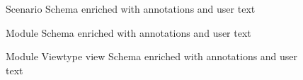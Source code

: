 \begin{figure}[h]
\centering

\caption{Scenario Schema enriched with annotations and user text}
\label{figure:scenarioTemplate2}
\end{figure}

\begin{figure}[h]
\centering

\caption{Module Schema enriched with annotations and user text}
\label{figure:moduleTemplate2}
\end{figure}

\begin{figure}[h]
\centering

\caption{Module Viewtype view Schema enriched with annotations and user text}
\label{figure:viewTemplate2}
\end{figure}

